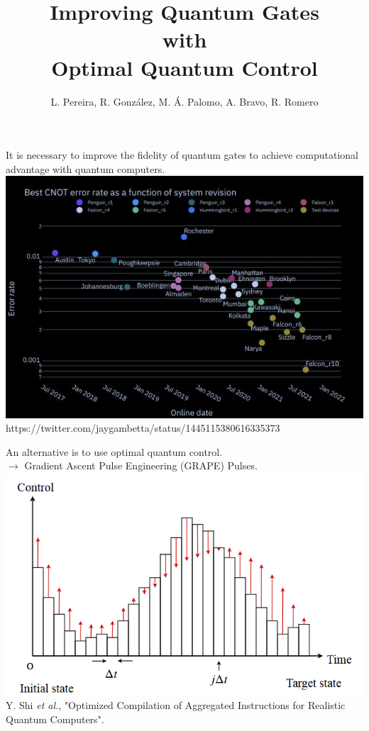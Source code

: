\documentclass[12pt,aspectratio=169]{beamer}
\title{ Improving Quantum Gates\\ with\\ Optimal Quantum Control}
\author{\large L. Pereira, R. González, M. Á. Palomo, A. Bravo, R. Romero}
\date{}
\begin{document}
	
	\begin{frame}
		\titlepage
	\end{frame}

	\begin{frame}
		\centering
		It is necessary to improve the fidelity of quantum gates to achieve computational advantage with quantum computers. \\
		\vspace{.5cm}
		\includegraphics[scale=0.4]{cnot_ibm.jpg}\\
		{\scriptsize  https://twitter.com/jaygambetta/status/1445115380616335373 }
	\end{frame}

	\begin{frame}
		\centering
		An alternative is to use optimal quantum control.\\
		\vspace{.5cm}
		$\rightarrow$ Gradient Ascent Pulse Engineering (GRAPE) Pulses.\\
		\vspace{.5cm}
		\includegraphics[scale=0.6]{grape}\\

		{\scriptsize  
		Y. Shi \emph{et al.}, "Optimized Compilation of Aggregated Instructions for Realistic Quantum Computers".}
		
	\end{frame}
\end{document}
